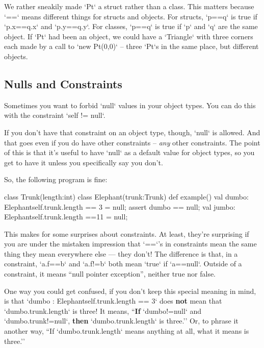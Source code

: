 \begin{finepoint}
We rather sneakily made \xcd`Pt` a struct rather than a class.   This matters
because \xcd`==` means different things for structs and objects.  For structs,
\xcd`p==q` is true if \xcd`p.x==q.x` and \xcd`p.y==q.y`.  For classes,
\xcd`p==q` is true if \xcd`p` and \xcd`q` are the same object.  
If \xcd`Pt` had been an object, we could have a \xcd`Triangle` with three
corners each made by a call to \xcd`new Pt(0,0)` -- three \xcd`Pt`s in the
same place, but different objects.
\end{finepoint}


\subsection{Nulls and Constraints}

Sometimes you want to forbid \xcd`null` values in your object types.  You can
do this with the constraint \xcd`{self != null}`.

If you don't have that constraint on an object type, though, \xcd`null` is
allowed. And that goes even if you do have other constraints -- {\em any}
other constraints. The point of this is that it's useful to have \xcd`null` as
a default value for object types, so you get to have it unless you
specifically say you don't. 

So, the following program is fine: 
\begin{xtennum}[]
 class Trunk(length:int){}
 class Elephant(trunk:Trunk){}
 def example() {
  val dumbo: Elephant{self.trunk.length == 3} = null;
  assert dumbo == null;
  val jumbo: Elephant{self.trunk.length ==11} = null;
}
\end{xtennum}

This makes for some surprises about constraints. At least, they're surprising
if you are under the mistaken impression that \xcd`==`'s in constraints mean
the same thing they mean everywhere else --- they don't! The difference is
that, in a constraint, \xcd`a.f==b` and \xcd`a.f!=b` both mean \xcd`true` if
\xcd`a==null`. Outside of a constraint, it means ``null pointer exception'',
neither true nor false.

One way you could get confused, if you don't keep this special meaning in
mind, is that \xcd`dumbo : Elephant{self.trunk.length == 3}` does {\bf not}
mean that \xcd`dumbo.trunk.length` is three!  It means, ``{\bf If}
\xcd`dumbo!=null` and \xcd`dumbo.trunk!=null`, {\bf then}
\xcd`dumbo.trunk.length` is three.''  Or, to phrase it another way, ``If
\xcd`dumbo.trunk.length` means anything at all, what it means is three.''

